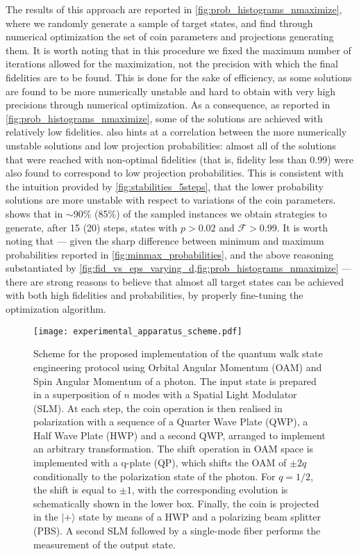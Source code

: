 The results of this approach are reported in \cref{fig:prob_histograms_nmaximize}, where we randomly generate a sample of target states, and find through numerical optimization the set of coin parameters and projections generating them.
It is worth noting that in this procedure we fixed the maximum number of iterations allowed for the maximization, not the precision with which the final fidelities are to be found.
This is done for the sake of efficiency, as some solutions are found to be more numerically unstable and hard to obtain with very high precisions through numerical optimization.
As a consequence, as reported in \cref{fig:prob_histograms_nmaximize}, some of the solutions are achieved with relatively low fidelities.
 also hints at a correlation between the more numerically unstable solutions and low projection probabilities:
almost all of the solutions that were reached with non-optimal fidelities (that is, fidelity less than 0.99) were also found to correspond to low projection probabilities.
This is consistent with the intuition provided by \cref{fig:stabilities_5steps},
that the lower probability solutions are more unstable with respect to variations of the coin parameters.
 shows that in $\sim$90\% (85\%) of the sampled instances we obtain strategies to generate, after 15 (20) steps, states with $p > 0.02$ and $\mathcal F > 0.99$.
It is worth noting that --- given the sharp difference between minimum and maximum probabilities reported in \cref{fig:minmax_probabilities}, and the above reasoning substantiated by \cref{fig:fid_vs_eps_varying_d,fig:prob_histograms_nmaximize} ---
there are strong reasons to believe that almost all target states can be achieved with both high fidelities and probabilities,
by properly fine-tuning the optimization algorithm.

\begin{figure*}[ht!]
\centering
\texttt{[image: experimental\_apparatus\_scheme.pdf]}
\caption{
	Scheme for the proposed implementation of the quantum walk state engineering protocol using Orbital Angular Momentum (OAM) and Spin Angular Momentum of a photon.
	The input state is prepared in a superposition of $n$ modes with a Spatial Light Modulator (SLM).
	At each step, the coin operation is then realised in polarization with a sequence of a Quarter Wave Plate (QWP), a Half Wave Plate (HWP) and a second QWP, arranged to implement an arbitrary transformation.
	The shift operation in OAM space is implemented with a q-plate (QP), which shifts the OAM of $\pm 2q$ conditionally to the polarization state of the photon.
	For $q=1/2$, the shift is equal to $\pm 1$, with the corresponding evolution is  schematically shown in the lower box.
	Finally, the coin is projected in the $\vert + \rangle$ state by means of a HWP and a polarizing beam splitter (PBS).
	A second SLM followed by a single-mode fiber performs the measurement of the output state.
}
\label{fig:proposal_exp}
\end{figure*}
